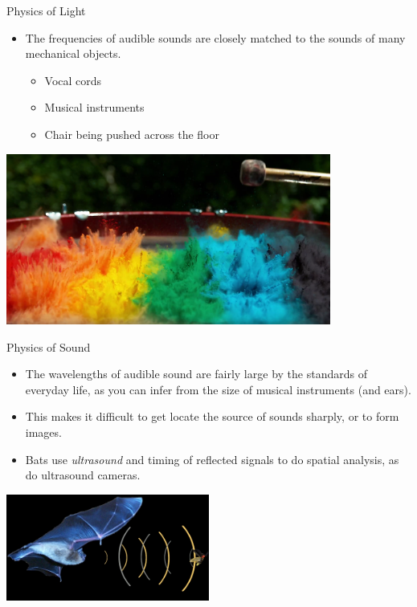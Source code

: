 \documentclass{beamer}
\begin{document}
\begin{frame}{Physics of Light}
   \begin{itemize}
      \item The frequencies of audible sounds are closely matched to the sounds of many mechanical objects.
      \begin{itemize}
         \item Vocal cords
         \item Musical instruments
         \item Chair being pushed across the floor
      \end{itemize}
   \end{itemize}
   \begin{center}
      \includegraphics[width=0.8\textwidth]{figures/drum.png}
   \end{center}
\end{frame}

\begin{frame}{Physics of Sound}
   \begin{itemize}
      \item The wavelengths of audible sound are fairly large by the standards of everyday life, as you can infer from the size of musical instruments (and ears).
      \item This makes it difficult to get locate the source of sounds sharply, or to form images.
      \item Bats use {\it ultrasound} and timing of reflected signals to do spatial analysis, as do ultrasound cameras.
   \end{itemize}
   \begin{center}
      \includegraphics[width=0.5\textwidth]{figures/bat.jpg}
   \end{center}
\end{frame}
\end{document}
